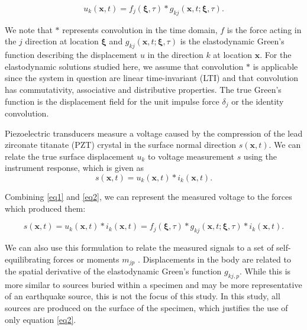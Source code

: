 \documentclass[preprint,3p, 11pt,authoryear]{elsarticle}
\begin{document}
\begin{equation}
\label{eq1}
           u_{k}\left( \mathbf{x}, t \right)  =  
            f_{j}\left( \mathbf{\xi}, \tau \right) \ast 
            g_{kj}\left( \mathbf{x}, t;\mathbf{\xi}, \tau \right).
\end{equation}

\noindent We note that $\ast$ represents convolution in the time domain, $f$ is the force acting in the $j$ direction at location $\mathbf{\xi}$ and $g_{kj}\left( \mathbf{x}, t;\mathbf{\xi}, \tau \right)$ is the elastodynamic Green's function describing the displacement $u$ in the direction $k$ at location $\mathbf{x}$. For the elastodynamic solutions studied here, we assume that convolution $\ast$ is applicable since the system in question are linear time-invariant (LTI) and that convolution has commutativity, associative and distributive properties. The true Green's function is the displacement field for the unit impulse force $\delta_{j}$ or the identity convolution. 

Piezoelectric transducers measure a voltage caused by the compression of the lead zirconate titanate (PZT) crystal in the surface normal direction $s\left( \mathbf{x}, t \right)$. We can relate the true surface displacement $u_{k}$ to voltage measurement $s$ using the instrument response, which is given as
   \begin{equation}
    \label{eq2}
        s\left( \mathbf{x}, t \right) =
            u_{k}\left( \mathbf{x}, t \right) \ast i_{k}\left(\mathbf{x},t \right).
    \end{equation}
    
    \noindent Combining \eqref{eq1} and \eqref{eq2}, we can represent the measured voltage to the forces which produced them:

    \begin{equation}
    \label{eq3}
        s\left( \mathbf{x}, t \right) =
            u_{k}\left( \mathbf{x}, t \right) \ast i_{k}\left(\mathbf{x}, t \right) =  
                f_{j}\left( \mathbf{\xi}, \tau \right) \ast 
                g_{kj}\left( \mathbf{x}, t;\mathbf{\xi}, \tau \right) \ast i_{k}\left(\mathbf{x},  t \right).
    \end{equation}

\noindent We can also use this formulation to relate the measured signals to a set of self-equilibrating forces or moments $m_{jp}$ \citep{Aki2002}. Displacements in the body are related to the spatial derivative of the elastodynamic Green's function $g_{kj,p}$.  While this is more similar to sources buried within a specimen and may be more representative of an earthquake source, this is not the focus of this study.  In this study, all sources are produced on the surface of the specimen, which justifies the use of only equation \eqref{eq2}.
\end{document}
